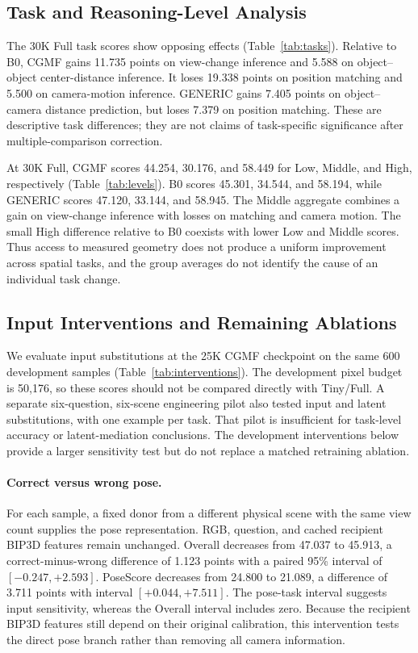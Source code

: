 \subsection{Task and Reasoning-Level Analysis}


The 30K Full task scores show opposing effects (Table~\ref{tab:tasks}). Relative to B0, CGMF gains 11.735 points on view-change inference and 5.588 on object--object center-distance inference. It loses 19.338 points on position matching and 5.500 on camera-motion inference. GENERIC gains 7.405 points on object--camera distance prediction, but loses 7.379 on position matching. These are descriptive task differences; they are not claims of task-specific significance after multiple-comparison correction.

At 30K Full, CGMF scores 44.254, 30.176, and 58.449 for Low, Middle, and High, respectively (Table~\ref{tab:levels}). B0 scores 45.301, 34.544, and 58.194, while GENERIC scores 47.120, 33.144, and 58.945. The Middle aggregate combines a gain on view-change inference with losses on matching and camera motion. The small High difference relative to B0 coexists with lower Low and Middle scores. Thus access to measured geometry does not produce a uniform improvement across spatial tasks, and the group averages do not identify the cause of an individual task change.

\subsection{Input Interventions and Remaining Ablations}
\label{sec:interventions}
We evaluate input substitutions at the 25K CGMF checkpoint on the same 600 development samples (Table~\ref{tab:interventions}). The development pixel budget is 50,176, so these scores should not be compared directly with Tiny/Full. A separate six-question, six-scene engineering pilot also tested input and latent substitutions, with one example per task. That pilot is insufficient for task-level accuracy or latent-mediation conclusions. The development interventions below provide a larger sensitivity test but do not replace a matched retraining ablation.


\paragraph{Correct versus wrong pose.}
For each sample, a fixed donor from a different physical scene with the same view count supplies the pose representation. RGB, question, and cached recipient BIP3D features remain unchanged. Overall decreases from 47.037 to 45.913, a correct-minus-wrong difference of 1.123 points with a paired 95\% interval of $[-0.247,+2.593]$. PoseScore decreases from 24.800 to 21.089, a difference of 3.711 points with interval $[+0.044,+7.511]$. The pose-task interval suggests input sensitivity, whereas the Overall interval includes zero. Because the recipient BIP3D features still depend on their original calibration, this intervention tests the direct pose branch rather than removing all camera information.

